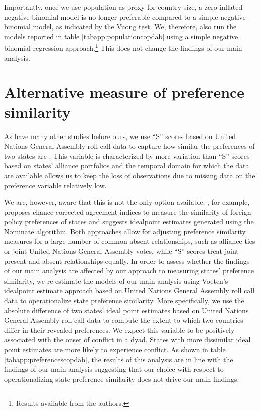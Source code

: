 \documentclass[12pt]{article}
\theoremstyle{hypothesis}
\begin{document}
Importantly, once we use population as proxy for country size, a zero-inflated negative binomial model is no longer preferable compared to a simple negative binomial model, as indicated by the Vuong test. We, therefore, also run the models reported in table  \ref{tabapp:populationcopdab} using a simple negative binomial regression approach.\footnote{Results available from the authors.} This does not change the findings of our main analysis.



\newpage

\section{Alternative measure of preference similarity}

As have many other studies before ours, we use ``S'' scores based on United Nations General Assembly roll call data to capture how similar the preferences of two states are \citep{Broz:2006, Gartzke:1998,Gartzke:2007, Bearce:2007, Savun:2011}. This variable is characterized by more variation than ``S'' scores based on states' alliance portfolios \citep{Signorino:2001} and the temporal domain for which the data are available allows us to keep the loss of observations due to missing data on the preference variable relatively low.

We are, however, aware that this is not the only option available. \citet{Haege:2011}, for example, proposes chance-corrected agreement indices to measure the similarity of foreign policy preferences of states and \citet{Voeten:2000} suggests idealpoint estimates generated using the Nominate algorithm. Both approaches allow for adjusting preference similarity measures for a large number of common absent relationships, such as alliance ties or joint United Nations General Assembly votes, while ``S'' scores treat joint present and absent relationships equally. In order to assess whether the findings of our main analysis are affected by our approach to measuring states' preference similarity, we re-estimate the models of our main analysis using Voeten's idealpoint estimate approach based on United Nations General Assembly roll call data to operationalize state preference similarity. More specifically, we use the absolute difference of two states' ideal point estimates based on United Nations General Assembly roll call data to compute the extent to which two countries differ in their revealed preferences. We expect this variable to be positively associated with the onset of conflict in a dyad. States with more dissimilar ideal point estimates are more likely to experience conflict. As shown in table \ref{tabapp:preferencescopdab}, the results of this analysis are in line with the findings of our main analysis suggesting that our choice with respect to operationalizing state preference similarity does not drive our main findings.
\end{document}
